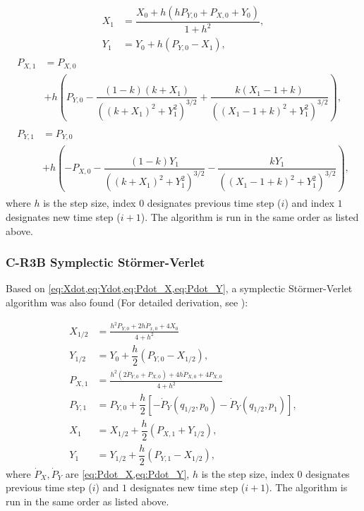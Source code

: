 \begin{align}
    X_1 &= \dfrac{X_0 + h (h P_{Y,0} + P_{X,0} + Y_0)}{1+h^2}, \\[0.4cm]
    Y_1 &= Y_0 + h (P_{Y,0} - X_1), \label{eq:symplectic-euler-Y_1}
\end{align}
\begin{align}
    \begin{aligned}
        P_{X,1} &= P_{X,0} \\
        &+ h \left(P_{Y,0} - \dfrac{(1-k)(k+X_1)}{((k+X_1)^2+Y_1^2)^{3/2}} + \dfrac{k(X_1-1+k)}{((X_1-1+k)^2+Y_1^2)^{3/2}}\right), \label{eq:symplectic-euler-PX_1}
    \end{aligned} \\[0.4cm]
    \begin{aligned}
        P_{Y,1} &= P_{Y,0} \\
        &+ h \left(-P_{X,0} - \dfrac{(1-k)Y_1}{((k+X_1)^2+Y_1^2)^{3/2}} - \dfrac{k Y_1}{((X_1-1+k)^2+Y_1^2)^{3/2}}\right), \label{eq:symplectic-euler-PY_1}
    \end{aligned}
\end{align}
where \(h\) is the step size, index \(0\) designates previous time step ($i$) and index \(1\) designates new time step ($i+1$). The algorithm is run in the same order as listed above.

\subsubsection{C-R3B Symplectic Störmer-Verlet}
Based on \cref{eq:Xdot,eq:Ydot,eq:Pdot_X,eq:Pdot_Y}, a symplectic Störmer-Verlet algorithm was also found (For detailed derivation, see \cite{Saxe2015}):

\begin{align}
    X_{1/2} &= \frac{h^2 P_{Y,0} + 2 h \dot{P}_{x,0} + 4 X_0}{4 + h^2} \label{eq:verlet-x_1/2} \\
    Y_{1/2} &= Y_0 + \dfrac{h}{2} (P_{Y,0} - X_{1/2}), \label{eq:verlet-y_1/2} \\
    P_{X,1} &= \frac{h^2 (2 \dot{P}_{Y,0} + P_{X,0}) + 4 h \dot{P}_{X,0} + 4 P_{X,0} }{4 + h^2} \label{eq:verlet-px_1} \\
    P_{Y,1} &= P_{Y,0} + \dfrac{h}{2} \left[-\dot{P}_Y(q_{1/2},p_0) -\dot{P}_Y(q_{1/2},p_1) \right], \label{eq:verlet-py_1} \\
    X_1 &= X_{1/2} + \dfrac{h}{2} (P_{X,1} + Y_{1/2}), \label{eq:verlet-x_1} \\
    Y_1 &= Y_{1/2} + \dfrac{h}{2} (P_{Y,1} - X_{1/2}), \label{eq:verlet-y_1}
\end{align}
where \(\dot{P}_X,\dot{P}_Y\) are \cref{eq:Pdot_X,eq:Pdot_Y}, \(h\) is the step size, index \(0\) designates previous time step ($i$) and \(1\) designates new time step ($i+1$). The algorithm is run in the same order as listed above.

